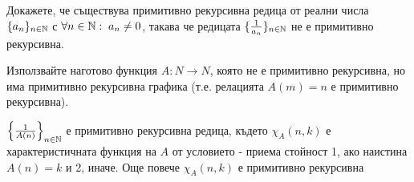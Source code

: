 \begin{problem}
    Докажете, че съществува примитивно рекурсивна редица от реални числа $\{a_n\}_{n\in{\mathbb{N}}}$ с $\forall n\in{\mathbb{N}}:\; a_n \neq 0$, такава че редицата $\{\frac{1}{a_n}\}_{n\in{\mathbb{N}}}$ не е примитивно рекурсивна.
\end{problem}
\begin{hint}
    Използвайте наготово функция $A : N \to N$, която не е примитивно рекурсивна, но има примитивно рекурсивна графика (т.е. релацията $A(m) = n$ е примитивно рекурсивна).
\end{hint}
\begin{solution}
    $\left\{\frac{1}{A(n)}\right\}_{n\in{\mathbb{N}}}$ е примитивно рекурсивна редица, където $\chi_A(n, k)$ е характеристичната функция на $A$ от условието - приема стойност 1, ако наистина $A(n) = k$ и 2, иначе. Още повече $\chi_A(n, k)$ е примитивно рекурсивна
\end{solution}